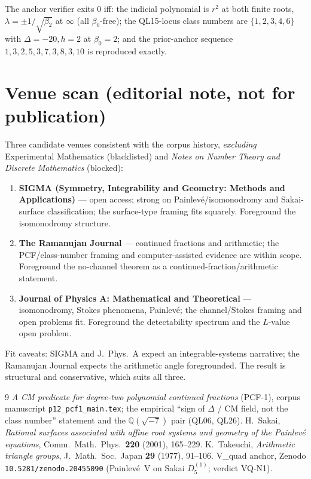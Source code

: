 \documentclass[11pt]{article}
\theoremstyle{definition}
\newcommand{\Q}{\mathbb{Q}}
\begin{document}
The anchor verifier exits $0$ iff: the indicial polynomial is $r^2$ at both finite
roots, $\lambda=\pm1/\sqrt{\beta_2}$ at $\infty$ (all $\beta_0$-free); the QL15-locus
class numbers are $\{1,2,3,4,6\}$ with $\Delta=-20,h=2$ at $\beta_0=2$; and the
prior-anchor sequence $1,3,2,5,3,7,3,8,3,10$ is reproduced exactly.

\section*{Venue scan (editorial note, not for publication)}
Three candidate venues consistent with the corpus history, \emph{excluding}
Experimental Mathematics (blacklisted) and \emph{Notes on Number Theory and Discrete
Mathematics} (blocked):
\begin{enumerate}[leftmargin=2em]
\item \textbf{SIGMA (Symmetry, Integrability and Geometry: Methods and Applications)}
--- open access; strong on Painlev\'e/isomonodromy and Sakai-surface classification;
the surface-type framing fits squarely. Foreground the isomonodromy structure.
\item \textbf{The Ramanujan Journal} --- continued fractions and arithmetic; the
PCF/class-number framing and computer-assisted evidence are within scope. Foreground
the no-channel theorem as a continued-fraction/arithmetic statement.
\item \textbf{Journal of Physics A: Mathematical and Theoretical} --- isomonodromy,
Stokes phenomena, Painlev\'e; the channel/Stokes framing and open problems fit.
Foreground the detectability spectrum and the $L$-value open problem.
\end{enumerate}
Fit caveats: SIGMA and J.\ Phys.\ A expect an integrable-systems narrative; the
Ramanujan Journal expects the arithmetic angle foregrounded. The result is structural
and conservative, which suits all three.

\begin{thebibliography}{9}
 \emph{A CM predicate for degree-two polynomial continued fractions}
(PCF-1), corpus manuscript \texttt{p12\_pcf1\_main.tex}; the empirical
``sign of $\Delta$ / CM field, not the class number'' statement and the
$\Q(\sqrt{-7})$ pair (QL06, QL26).
 H.~Sakai, \emph{Rational surfaces associated with affine root
systems and geometry of the Painlev\'e equations}, Comm.\ Math.\ Phys.\ \textbf{220}
(2001), 165--229.
 K.~Takeuchi, \emph{Arithmetic triangle groups}, J.\ Math.\
Soc.\ Japan \textbf{29} (1977), 91--106.
 V\_quad anchor, Zenodo \texttt{10.5281/zenodo.20455090}
(Painlev\'e~V on Sakai $D_5^{(1)}$; verdict VQ-N1).
\end{thebibliography}
\end{document}
